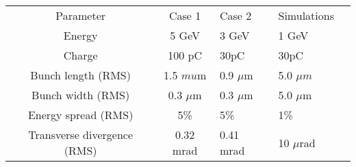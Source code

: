 \documentclass[%
 onecolumn,notitlepage,
 amsmath,amssymb,
 aps,
 longbibliography
]{revtex4-1}
\begin{document}
\begin{center}
\begin{minipage}[t]{0.7\textwidth}
\begin{table}[H]
\begin{ruledtabular}
\begin{tabular}{ccllc}
&\hspace{-12pt}{EuPRAXIA bunch parameters}\vspace{1pt} \\
\hline
Parameter&Case 1 &\hspace{-35pt} Case 2 & Simulations\\
\hline
Energy&5 GeV  &\hspace{-35pt} 3 GeV &1 GeV  \\
Charge&100 pC &\hspace{-35pt} 30pC& 30pC \\
Bunch length (RMS)& 1.5 $mu$m  &\hspace{-35pt}  0.9 $\mu$m &5.0 $\mu m$ \\
Bunch width (RMS)&0.3 $\mu$m & \hspace{-35pt} 0.3 $\mu$m&5.0 $\mu$m   \\
Energy spread (RMS)& 5\%& \hspace{-35pt} 5\%  &1\% \\
Transverse divergence (RMS) & 0.32 mrad  &  \hspace{-35pt} 0.41 mrad &10 $\mu$rad \\
\end{tabular}
\end{ruledtabular}
\end{table}
\end{minipage}
\end{center}
\end{document}
